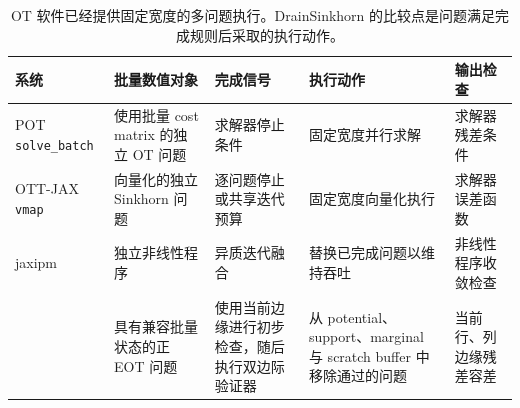 \begin{table}[t]
\centering
\caption{OT 软件已经提供固定宽度的多问题执行。DrainSinkhorn 的比较点是问题满足完成规则后采取的执行动作。}
\label{tab:prior-systems}
\scriptsize
\setlength{\tabcolsep}{3.2pt}
\begin{tabular}{@{}p{}p{}p{}p{}p{}@{}}
\toprule
系统 & 批量数值对象 & 完成信号 & 执行动作 & 输出检查 \\
\midrule
POT \texttt{solve\_batch} \citep{flamary2021pot,pot2025batch}
& 使用批量 cost matrix 的独立 OT 问题
& 求解器停止条件
& 固定宽度并行求解
& 求解器残差条件 \\
OTT-JAX \texttt{vmap} \citep{cuturi2022ott}
& 向量化的独立 Sinkhorn 问题
& 逐问题停止或共享迭代预算
& 固定宽度向量化执行
& 求解器误差函数 \\
jaxipm \citep{viljoen2026jaxipm}
& 独立非线性程序
& 异质迭代融合
& 替换已完成问题以维持吞吐
& 非线性程序收敛检查 \\
\policy{}
& 具有兼容批量状态的正 EOT 问题
& 使用当前边缘进行初步检查，随后执行双边际验证器
& 从 potential、support、marginal 与 scratch buffer 中移除通过的问题
& 当前行、列边缘残差容差 \\
\bottomrule
\end{tabular}
\end{table}
